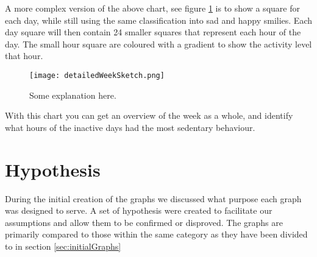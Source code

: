 A more complex version of the above chart, see figure \ref{fig:detailedWeek} is to show a square for each day, while still using the same classification into sad and happy smilies. Each day square will then contain 24 smaller squares that represent each hour of the day. The small hour square are coloured with a gradient to show the activity level that hour.

\begin{figure}[h!]
	\centering
		\texttt{[image: detailedWeekSketch.png]}
		\caption{\footnotesize Some explanation here.}
		\label{fig:detailedWeek}
\end{figure}

With this chart you can get an overview of the week as a whole, and identify what hours of the inactive days had the most sedentary behaviour. 

\section{Hypothesis}
During the initial creation of the graphs %
we discussed what purpose each graph was designed to serve. A set of hypothesis were created to facilitate our assumptions and allow them to be confirmed or disproved. The graphs are primarily compared to those within the same category as they have been divided to in section \ref{sec:initialGraphs}


